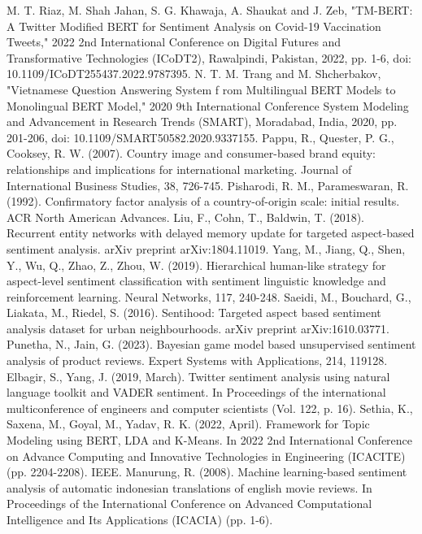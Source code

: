 \documentclass[conference]{IEEEtran}
\begin{document}
\begin{thebibliography}{00}
	 M. T. Riaz, M. Shah Jahan, S. G. Khawaja, A. Shaukat and J. Zeb, "TM-BERT: A Twitter Modified BERT for Sentiment Analysis on Covid-19 Vaccination Tweets," 2022 2nd International Conference on Digital Futures and Transformative Technologies (ICoDT2), Rawalpindi, Pakistan, 2022, pp. 1-6, doi: 10.1109/ICoDT255437.2022.9787395. 
	 N. T. M. Trang and M. Shcherbakov, "Vietnamese Question Answering System f rom Multilingual BERT Models to Monolingual BERT Model," 2020 9th International Conference System Modeling and Advancement in Research Trends (SMART), Moradabad, India, 2020, pp. 201-206, doi: 10.1109/SMART50582.2020.9337155. 
	 Pappu, R., Quester, P. G., Cooksey, R. W. (2007). Country image and consumer-based brand equity: relationships and implications for international marketing. Journal of International Business Studies, 38, 726-745.
	 Pisharodi, R. M., Parameswaran, R. (1992). Confirmatory factor analysis of a country-of-origin scale: initial results. ACR North American Advances.
	 Liu, F., Cohn, T., Baldwin, T. (2018). Recurrent entity networks with delayed memory update for targeted aspect-based sentiment analysis. arXiv preprint arXiv:1804.11019.
	 Yang, M., Jiang, Q., Shen, Y., Wu, Q., Zhao, Z., Zhou, W. (2019). Hierarchical human-like strategy for aspect-level sentiment classification with sentiment linguistic knowledge and reinforcement learning. Neural Networks, 117, 240-248.
	 Saeidi, M., Bouchard, G., Liakata, M., Riedel, S. (2016). Sentihood: Targeted aspect based sentiment analysis dataset for urban neighbourhoods. arXiv preprint arXiv:1610.03771.
	 Punetha, N., Jain, G. (2023). Bayesian game model based unsupervised sentiment analysis of product reviews. Expert Systems with Applications, 214, 119128.
	 Elbagir, S., Yang, J. (2019, March). Twitter sentiment analysis using natural language toolkit and VADER sentiment. In Proceedings of the international multiconference of engineers and computer scientists (Vol. 122, p. 16).
	 Sethia, K., Saxena, M., Goyal, M., Yadav, R. K. (2022, April). Framework for Topic Modeling using BERT, LDA and K-Means. In 2022 2nd International Conference on Advance Computing and Innovative Technologies in Engineering (ICACITE) (pp. 2204-2208). IEEE.
	 Manurung, R. (2008). Machine learning-based sentiment analysis of automatic indonesian translations of english movie reviews. In Proceedings of the International Conference on Advanced Computational Intelligence and Its Applications (ICACIA) (pp. 1-6).

\end{thebibliography}
\end{document}
